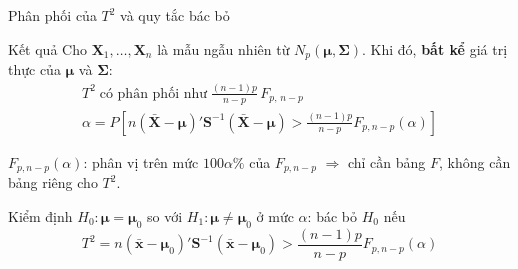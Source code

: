 \begin{frame}{Phân phối của \texorpdfstring{\(T^2\)}{T2} và quy tắc bác bỏ}
  \vspace{-0.1cm}
  \begin{block}{Kết quả}
    Cho \(\mathbf{X}_1,\ldots,\mathbf{X}_n\) là mẫu ngẫu nhiên từ \(N_p(\boldsymbol{\mu},\boldsymbol{\Sigma})\). Khi đó,
    \textbf{bất kể} giá trị thực của \(\boldsymbol{\mu}\) và \(\boldsymbol{\Sigma}\):
    \vspace{-0.2cm}
    \begin{gather*}
      T^2 \;\text{có phân phối như}\; \frac{(n-1)p}{n-p}\,F_{p,\,n-p}
      \tag{5-5}\\
      \alpha
      = P\!\left[
        n(\bar{\mathbf{X}}-\boldsymbol{\mu})'\mathbf{S}^{-1}(\bar{\mathbf{X}}-\boldsymbol{\mu})
        > \frac{(n-1)p}{n-p}F_{p,n-p}(\alpha)
      \right]
      \tag{5-6}
    \end{gather*}
    \vspace{-0.35cm}

    {\small \(F_{p,n-p}(\alpha)\): phân vị trên mức \(100\alpha\%\) của \(F_{p,n-p}\) \(\Rightarrow\) chỉ cần bảng \(F\), không cần bảng riêng cho \(T^2\).}
  \end{block}
  \vspace{-0.05cm}
  \begin{alertblock}{Kiểm định \(H_0:\boldsymbol{\mu}=\boldsymbol{\mu}_0\) so với \(H_1:\boldsymbol{\mu}\ne\boldsymbol{\mu}_0\) ở mức \(\alpha\): bác bỏ \(H_0\) nếu}
    \vspace{-0.2cm}
    \begin{equation*}
      T^2
      = n(\bar{\mathbf{x}}-\boldsymbol{\mu}_0)'\mathbf{S}^{-1}(\bar{\mathbf{x}}-\boldsymbol{\mu}_0)
      > \frac{(n-1)p}{n-p}F_{p,n-p}(\alpha)
      \tag{5-7}
    \end{equation*}
  \end{alertblock}
\end{frame}

